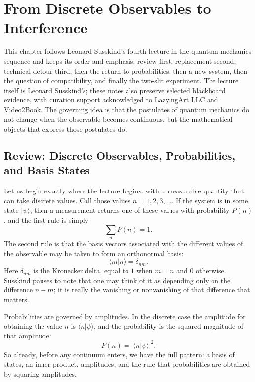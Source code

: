 \chapter{From Discrete Observables to Interference}

This chapter follows Leonard Susskind's fourth lecture in the quantum mechanics sequence and keeps its order and emphasis: review first, replacement second, technical detour third, then the return to probabilities, then a new system, then the question of compatibility, and finally the two-slit experiment. The lecture itself is Leonard Susskind's; these notes also preserve selected blackboard evidence, with curation support acknowledged to LazyingArt LLC and Video2Book. The governing idea is that the postulates of quantum mechanics do not change when the observable becomes continuous, but the mathematical objects that express those postulates do.

\section{Review: Discrete Observables, Probabilities, and Basis States}

Let us begin exactly where the lecture begins: with a measurable quantity that can take discrete values. Call those values \(n=1,2,3,\dots\). If the system is in some state \(|\psi\rangle\), then a measurement returns one of these values with probability \(P(n)\), and the first rule is simply
\begin{equation}
\sum_n P(n)=1.
\end{equation}
The second rule is that the basis vectors associated with the different values of the observable may be taken to form an orthonormal basis:
\begin{equation}
\langle m|n\rangle=\delta_{nm}.
\end{equation}
Here \(\delta_{nm}\) is the Kronecker delta, equal to \(1\) when \(m=n\) and \(0\) otherwise. Susskind pauses to note that one may think of it as depending only on the difference \(n-m\); it is really the vanishing or nonvanishing of that difference that matters.

Probabilities are governed by amplitudes. In the discrete case the amplitude for obtaining the value \(n\) is \(\langle n|\psi\rangle\), and the probability is the squared magnitude of that amplitude:
\begin{equation}
P(n)=|\langle n|\psi\rangle|^2.
\end{equation}
So already, before any continuum enters, we have the full pattern: a basis of states, an inner product, amplitudes, and the rule that probabilities are obtained by squaring amplitudes.

